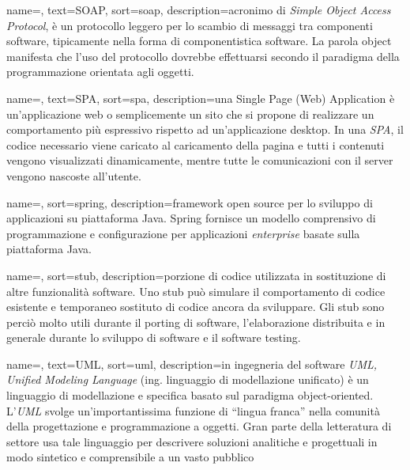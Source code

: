 {
  name=,
	text=SOAP,
	sort=soap,
	description={acronimo di \emph{Simple Object Access Protocol}, è un protocollo leggero per lo scambio di messaggi tra componenti software, tipicamente nella forma di componentistica software. La parola object manifesta che l'uso del protocollo dovrebbe effettuarsi secondo il paradigma della programmazione orientata agli oggetti.}
}

{
	name=,
	text=SPA,
	sort=spa,
	description={una Single Page (Web) Application è un'applicazione web o semplicemente un sito che si propone di realizzare un comportamento più espressivo rispetto ad un'applicazione desktop. In una \emph{SPA}, il codice necessario viene caricato al caricamento della pagina e tutti i contenuti vengono visualizzati dinamicamente, mentre tutte le comunicazioni con il server vengono nascoste all'utente.}
}

{
	name=,
	sort=spring,
	description={framework open source per lo sviluppo di applicazioni su piattaforma Java. Spring fornisce un modello comprensivo di programmazione e configurazione per applicazioni \emph{enterprise} basate sulla piattaforma Java.}
}

{
	name=,
	sort=stub,
	description={porzione di codice utilizzata in sostituzione di altre funzionalità software. Uno stub può simulare il comportamento di codice esistente e temporaneo sostituto di codice ancora da sviluppare. Gli stub sono perciò molto utili durante il porting di software, l'elaborazione distribuita e in generale durante lo sviluppo di software e il software testing.}
}
		
{
    name=,
    text=UML,
    sort=uml,
    description={in ingegneria del software \emph{UML, Unified Modeling Language} (ing. linguaggio di modellazione unificato) è un linguaggio di modellazione e specifica basato sul paradigma object-oriented. L'\emph{UML} svolge un'importantissima funzione di ``lingua franca'' nella comunità della progettazione e programmazione a oggetti. Gran parte della letteratura di settore usa tale linguaggio per descrivere soluzioni analitiche e progettuali in modo sintetico e comprensibile a un vasto pubblico}
}
